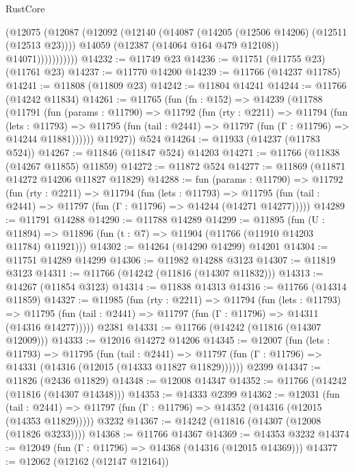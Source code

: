 \begin{lexlean}{RustCore}
\begin{coremodule}
                  (@12075
                    (@12087
                      (@12092
                        (@12140
                          (@14087 (@14205 (@12506 @14206) (@12511 (@12513 @23))))
                          @14059
                          (@12387 (@14064 @164 @479 @12108))
                          @14071)))))))))))
@14232 := @11749 @23
@14236 := @11751 (@11755 @23) (@11761 @23)
@14237 := @11770 @14200
@14239 := @11766 (@14237 @11785)
@14241 := @11808 (@11809 @23)
@14242 := @11804 @14241
@14244 := @11766 (@14242 @11834)
@14261 := @11765
    (fun (fn : @152) =>
    @14239
      (@11788
        (@11791
          (fun (params : @11790) =>
          @11792
            (fun (rty : @2211) =>
            @11794
              (fun (lets : @11793) =>
              @11795 (fun (tail : @2441) => @11797 (fun (Γ : @11796) => @14244 @11881))))))
        @11927))
    @524
@14264 := @11933 (@14237 (@11783 @524))
@14267 := @11846 (@11847 @524) @14203
@14271 := @11766 (@11838 (@14267 @11855) @11859)
@14272 := @11872 @524
@14277 := @11869 (@11871 @14272 @14206 @11827 @11829)
@14288 := fun (params : @11790) =>
  @11792
    (fun (rty : @2211) =>
    @11794
      (fun (lets : @11793) =>
      @11795 (fun (tail : @2441) => @11797 (fun (Γ : @11796) => @14244 (@14271 @14277)))))
@14289 := @11791 @14288
@14290 := @11788 @14289
@14299 := @11895
    (fun (U : @11894) => @11896 (fun (t : @7) => @11904 (@11766 (@11910 @14203 @11784) @11921)))
@14302 := @14264 (@14290 @14299) @14201
@14304 := @11751 @14289 @14299
@14306 := @11982 @14288 @3123
@14307 := @11819 @3123
@14311 := @11766 (@14242 (@11816 (@14307 @11832)))
@14313 := @14267 (@11854 @3123)
@14314 := @11838 @14313
@14316 := @11766 (@14314 @11859)
@14327 := @11985
    (fun (rty : @2211) =>
    @11794
      (fun (lets : @11793) =>
      @11795 (fun (tail : @2441) => @11797 (fun (Γ : @11796) => @14311 (@14316 @14277)))))
    @2381
@14331 := @11766 (@14242 (@11816 (@14307 @12009)))
@14333 := @12016 @14272 @14206
@14345 := @12007
    (fun (lets : @11793) =>
    @11795
      (fun (tail : @2441) =>
      @11797 (fun (Γ : @11796) => @14331 (@14316 (@12015 (@14333 @11827 @11829))))))
    @2399
@14347 := @11826 (@2436 @11829)
@14348 := @12008 @14347
@14352 := @11766 (@14242 (@11816 (@14307 @14348)))
@14353 := @14333 @2399
@14362 := @12031
    (fun (tail : @2441) => @11797 (fun (Γ : @11796) => @14352 (@14316 (@12015 (@14353 @11829)))))
    @3232
@14367 := @14242 (@11816 (@14307 (@12008 (@11826 @3233))))
@14368 := @11766 @14367
@14369 := @14353 @3232
@14374 := @12049 (fun (Γ : @11796) => @14368 (@14316 (@12015 @14369)))
@14377 := @12062 (@12162 (@12147 @12164))

\end{coremodule}
\end{lexlean}
